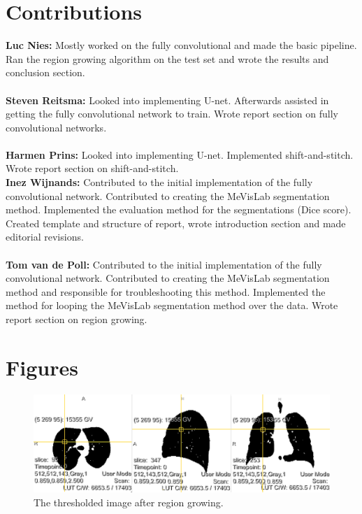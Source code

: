 \documentclass[a4paper,10pt]{article}
\numberwithin{equation}{section} %
\numberwithin{figure}{section} %
\numberwithin{table}{section} %
\begin{document}
\clearpage

\appendix
\section{Contributions}

\textbf{Luc Nies:} Mostly worked on the fully convolutional and made the basic pipeline. Ran the region growing algorithm on the test set and wrote the results and conclusion section.\\
\\
\textbf{Steven Reitsma:} Looked into implementing U-net. Afterwards assisted in getting the fully convolutional network to train. Wrote report section on fully convolutional networks.\\
\\
\textbf{Harmen Prins:} Looked into implementing U-net. Implemented shift-and-stitch. Wrote report section on shift-and-stitch.
\\
\textbf{Inez Wijnands:} Contributed to the initial implementation of the fully convolutional network. Contributed to creating the MeVisLab segmentation method. Implemented the evaluation method for the segmentations (Dice score). Created template and structure of report, wrote introduction section and made editorial revisions.\\
\\
\textbf{Tom van de Poll:} Contributed to the initial implementation of the fully convolutional network. Contributed to creating the MeVisLab segmentation method and responsible for troubleshooting this method. Implemented the method for looping the MeVisLab segmentation method over the data. Wrote report section on region growing.

\section{Figures}

\begin{figure}[h]
	\centering
	\includegraphics[width=\textwidth]{regiongrowing}
    \caption{The thresholded image after region growing.}
    \label{fig:reg-gro}
\end{figure}
\end{document}
